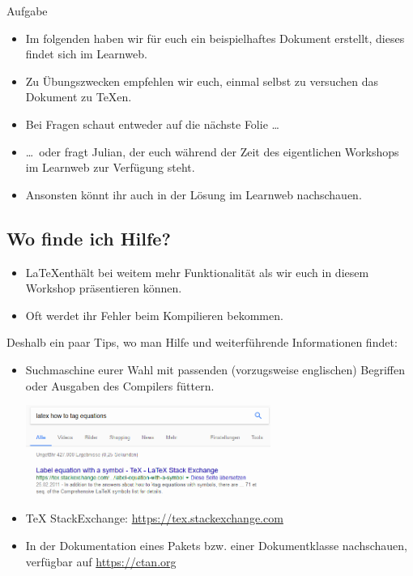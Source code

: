 \documentclass[german]{f1rstlady/templates/presentation}
\begin{document}
\begin{frame}{Aufgabe}
\begin{itemize}
    \item Im folgenden haben wir für euch ein beispielhaftes Dokument erstellt, dieses findet sich
        im Learnweb.
    \item Zu Übungszwecken empfehlen wir euch, einmal selbst zu versuchen das Dokument zu TeXen.
    \item Bei Fragen schaut entweder auf die nächste Folie \dots
    \item \dots~oder fragt Julian, der euch während der Zeit des eigentlichen Workshops im Learnweb
        zur Verfügung steht.
    \item Ansonsten könnt ihr auch in der Lösung im Learnweb nachschauen.
\end{itemize}
\end{frame}

\subsection{Wo finde ich Hilfe?}

\begin{frame}{\subsecname}
\begin{itemize}
    \item \LaTeX enthält bei weitem mehr Funktionalität als wir euch in diesem Workshop präsentieren
        können.
    \item Oft werdet ihr Fehler beim Kompilieren bekommen.
\end{itemize}
Deshalb ein paar Tips, wo man Hilfe und weiterführende Informationen findet:
\begin{itemize}
    \item \alert{Suchmaschine} eurer Wahl mit passenden (vorzugsweise englischen) Begriffen oder
        Ausgaben des Compilers füttern.
	\begin{center}
		\includegraphics[keepaspectratio,width=8cm]{images/google.png}
	\end{center}
	\item \alert{TeX StackExchange}: \url{https://tex.stackexchange.com}
    \item In der \alert{Dokumentation} eines Pakets bzw. einer Dokumentklasse nachschauen, verfügbar
        auf \url{https://ctan.org}
\end{itemize}
\end{frame}
\end{document}
